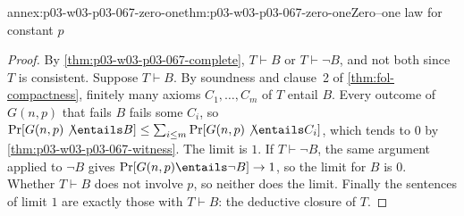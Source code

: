 \begin{annexitem}{annex:p03-w03-p03-067-zero-one}{thm:p03-w03-p03-067-zero-one}{Zero--one law for constant \(p\)}
\begin{proof}
By \cref{thm:p03-w03-p03-067-complete}, \(T\vdash B\) or \(T\vdash\neg B\),
and not both since \(T\) is consistent.  Suppose \(T\vdash B\).  By
soundness and clause~2 of \cref{thm:fol-compactness}, finitely many axioms
\(C_1,\ldots,C_m\) of \(T\) entail \(B\).  Every outcome of \(G(n,p)\) that
fails \(B\) fails some \(C_i\), so
\(\Pr[G(n,p)\not\entails B]\leq\sum_{i\leq m}\Pr[G(n,p)\not\entails C_i]\),
which tends to \(0\) by \cref{thm:p03-w03-p03-067-witness}.  The limit is
\(1\).  If \(T\vdash\neg B\), the same argument applied to \(\neg B\) gives
\(\Pr[G(n,p)\entails\neg B]\to1\), so the limit for \(B\) is \(0\).  Whether
\(T\vdash B\) does not involve \(p\), so neither does the limit.  Finally the
sentences of limit \(1\) are exactly those with \(T\vdash B\): the deductive
closure of \(T\).
\end{proof}
\end{annexitem}

